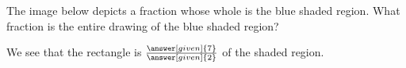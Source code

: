 \documentclass[nooutcomes]{ximera}
\begin{document}
\begin{problem}
The image below depicts a fraction whose whole is the blue shaded region.  What fraction is the entire drawing of the blue shaded region?
\begin{center} \end{center}

\begin{prompt}
We see that the rectangle is $\frac{\answer[given]{7}}{\answer[given]{2}}$ of the shaded region.
\end{prompt}

\end{problem}
\end{document}
